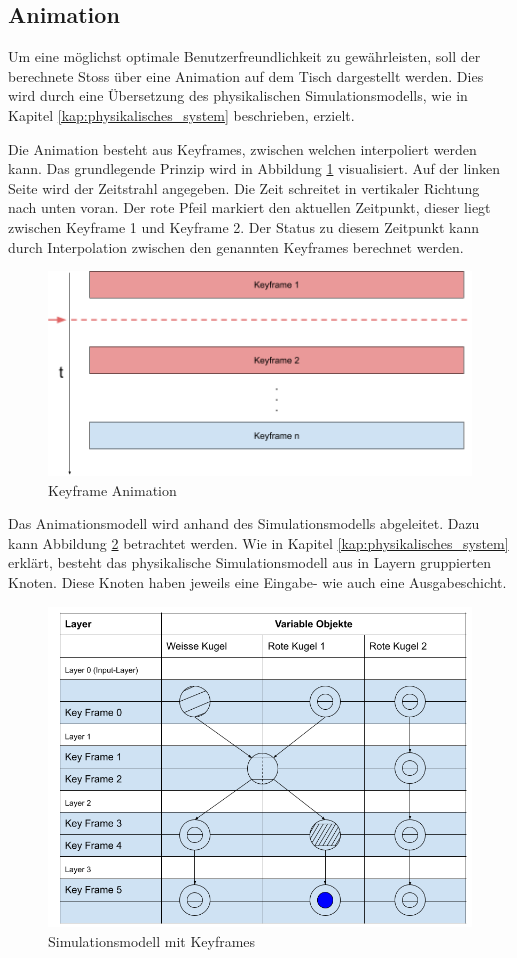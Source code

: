 \subsection{Animation}
Um eine möglichst optimale Benutzerfreundlichkeit zu gewährleisten, soll der berechnete Stoss über eine Animation
auf dem Tisch dargestellt werden. Dies wird durch eine Übersetzung des physikalischen Simulationsmodells, wie in Kapitel
\ref{kap:physikalisches_system} beschrieben, erzielt.

Die Animation besteht aus Keyframes, zwischen welchen interpoliert werden kann. Das grundlegende Prinzip wird in Abbildung
\ref{fig:keyframe_animation} visualisiert. Auf der linken Seite wird der Zeitstrahl angegeben. Die Zeit schreitet in vertikaler
Richtung nach unten voran. Der rote Pfeil markiert den aktuellen Zeitpunkt, dieser liegt zwischen Keyframe 1 und Keyframe 2.
Der Status zu diesem Zeitpunkt kann durch Interpolation zwischen den genannten Keyframes berechnet werden.

\begin{figure}[h!]
    \begin{center}
        \includegraphics[width=0.6\linewidth]{../common/03_billiard_ai/resources/31_keyframe_animation.png}
    \end{center}
    \caption{Keyframe Animation}
    \label{fig:keyframe_animation}
\end{figure}

Das Animationsmodell wird anhand des Simulationsmodells abgeleitet. Dazu kann Abbildung
\ref{fig:simulationsmodell_keyframes} betrachtet werden. Wie in Kapitel \ref{kap:physikalisches_system} erklärt, besteht
das physikalische Simulationsmodell aus in Layern gruppierten Knoten. Diese Knoten haben jeweils eine Eingabe- wie auch
eine Ausgabeschicht.

\begin{figure}[h!]
    \begin{center}
        \includegraphics[width=0.6\linewidth]{../common/03_billiard_ai/resources/18_animation_keyframes.png}
    \end{center}
    \caption{Simulationsmodell mit Keyframes}
    \label{fig:simulationsmodell_keyframes}
\end{figure}

